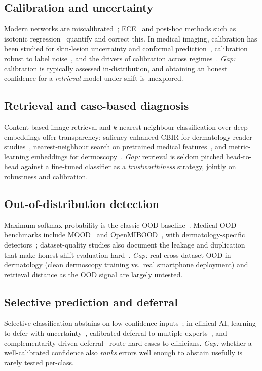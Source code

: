 \documentclass[conference]{IEEEtran}
\begin{document}
\subsection{Calibration and uncertainty}
Modern networks are miscalibrated~\cite{guo2017}; ECE~\cite{naeini2015} and
post-hoc methods such as isotonic regression~\cite{zadrozny2002} quantify and
correct this. In medical imaging, calibration has been studied for skin-lesion
uncertainty and conformal prediction~\cite{fayyad2024conformal}, calibration
robust to label noise~\cite{penso2024calibration}, and the drivers of
calibration across regimes~\cite{sambyal2023understanding}. \emph{Gap:}
calibration is typically assessed in-distribution, and obtaining an honest
confidence for a \emph{retrieval} model under shift is unexplored.

\subsection{Retrieval and case-based diagnosis}
Content-based image retrieval and $k$-nearest-neighbour classification over deep
embeddings offer transparency: saliency-enhanced CBIR for dermatology reader
studies~\cite{gassner2023secbir}, nearest-neighbour search on pretrained medical
features~\cite{gupta2023mednn}, and metric-learning embeddings for
dermoscopy~\cite{he2022demal}. \emph{Gap:} retrieval is seldom pitched
head-to-head against a fine-tuned classifier as a \emph{trustworthiness}
strategy, jointly on robustness and calibration.

\subsection{Out-of-distribution detection}
Maximum softmax probability is the classic OOD baseline~\cite{hendrycks2017}.
Medical OOD benchmarks include MOOD~\cite{zimmerer2022mood} and
OpenMIBOOD~\cite{gutbrod2025openmibood}, with dermatology-specific
detectors~\cite{huang2022multiscale}; dataset-quality studies also document the
leakage and duplication that make honest shift evaluation
hard~\cite{abhishek2025dermamnist}. \emph{Gap:} real cross-dataset OOD in
dermatology (clean dermoscopy training vs.\ real smartphone deployment) and
retrieval distance as the OOD signal are largely untested.

\subsection{Selective prediction and deferral}
Selective classification abstains on low-confidence inputs~\cite{geifman2017};
in clinical AI, learning-to-defer with uncertainty~\cite{liu2022ldu}, calibrated
deferral to multiple experts~\cite{verma2023multiexpert}, and
complementarity-driven deferral~\cite{dvijotham2023codoc} route hard cases to
clinicians. \emph{Gap:} whether a well-calibrated confidence also \emph{ranks}
errors well enough to abstain usefully is rarely tested per-class.
\end{document}
